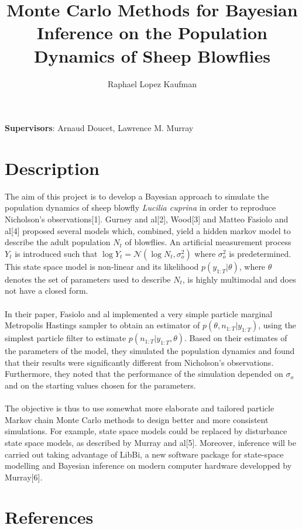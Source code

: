 \documentclass{article}
\title{Monte Carlo Methods for Bayesian Inference on the Population Dynamics of Sheep Blowflies}
\author{Raphael Lopez Kaufman}
\date{}
\begin{document}
\maketitle

{\Large \textbf{Supervisors}: Arnaud Doucet, Lawrence M. Murray}

\section*{Description}
The aim of this project is to develop a Bayesian approach to simulate the population dynamics of sheep blowfly \textit{Lucilia cuprina} in order to reproduce Nicholson's observations[1]. Gurney and al[2], Wood[3] and Matteo Fasiolo and al[4] proposed several models which, combined, yield a hidden markov model to describe the adult population $N_t$ of blowflies. An artificial measurement process $Y_t$ is introduced such that $\log{Y_t} = \mathcal{N}(\log{N_t}, \sigma_o^2)$ where $\sigma_o^2$ is predetermined. This state space model is non-linear and its likelihood $p(y_{1:T}|\theta)$, where $\theta$ denotes the set of parameters used to describe $N_t$, is highly multimodal and does not have a closed form.
\\ \\
In their paper, Fasiolo and al implemented a very simple particle marginal Metropolis Hastings sampler to obtain an estimator of $p(\theta, n_{1:T}|y_{1:T})$, using the simplest particle filter to estimate $p(n_{1:T}|y_{1:T}, \theta)$. Based on their estimates of the parameters of the model, they simulated the population dynamics and found that their results were significantly different from Nicholson's observations. Furthermore, they noted that the performance of the simulation depended on $\sigma_o$ and on the starting values chosen for the parameters.
\\ \\
The objective is thus to use somewhat more elaborate and tailored particle Markov chain Monte Carlo methods to design better and more consistent simulations. For example, state space models could be replaced by disturbance state space models, as described by Murray and al[5]. Moreover, inference will be carried out taking advantage of LibBi, a new software package for state-space modelling and Bayesian inference on modern computer hardware developped by Murray[6].

\section*{References}
\end{document}
